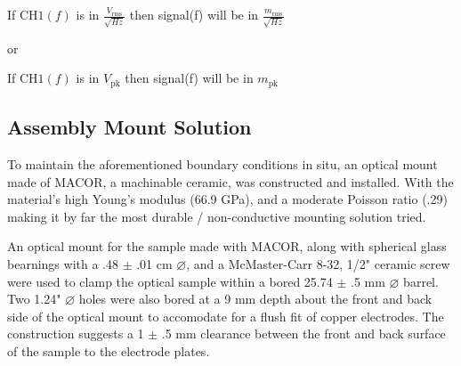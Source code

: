 If \(\mathrm{CH1}(f)\) is in \(\frac{V_\mathrm{rms}}{\sqrt{Hz}}\) then
signal(f) will be in \(\frac{m_\mathrm{rms}}{\sqrt{Hz}}\)

or

If \(\mathrm{CH1}(f)\) is in \(V_\mathrm{pk}\) then signal(f) will be in
\(m_\mathrm{pk}\) 
\fi


\subsection{Assembly Mount Solution}
To maintain the aforementioned boundary conditions in situ, an optical mount made of MACOR, a machinable ceramic, was constructed and installed. With the material's high Young's modulus (66.9 GPa), and a moderate Poisson ratio (.29) \cite{macor} making it by far the most durable / non-conductive mounting solution tried.

An optical mount for the sample made with MACOR, along with spherical glass bearnings with a .48 $\pm$ .01 cm $\diameter$, and a McMaster-Carr 8-32, 1/2" ceramic screw were used to clamp the optical sample within a bored 25.74 $\pm$ .5 mm $\diameter$ barrel. Two 1.24" $\diameter$ holes were also bored at a 9 mm depth about the front and back side of the optical mount to accomodate for a flush fit of copper electrodes. The construction suggests a 1 $\pm$ .5 mm clearance between the front and back surface of the sample to the electrode plates.

